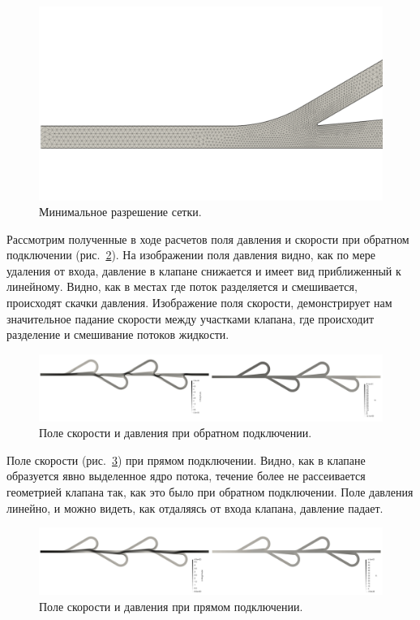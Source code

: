 \documentclass[10pt,a4paper]{book}
\begin{document}
    \begin{figure}[H]
        \centering
        \includegraphics[width = 1\linewidth]{minMesh}
        \caption{Минимальное разрешение сетки.}
        \label{fig:minMesh}
    \end{figure}
    
    Рассмотрим полученные в ходе расчетов поля давления и скорости при обратном подключении (рис.~\ref{fig:UPFieldsReverse}). На изображении поля давления видно, как по мере удаления от входа, давление в клапане снижается и имеет вид приближенный к линейному. Видно, как в местах где поток разделяется и смешивается, происходят скачки давления. Изображение поля скорости, демонстрирует нам значительное падание скорости между участками клапана, где происходит разделение и смешивание потоков жидкости.
    
    \begin{figure}[H]
        \centering
        \includegraphics[width = 1\linewidth]{UPFieldsReverse}
        \caption{Поле скорости и давления при обратном подключении.}
        \label{fig:UPFieldsReverse}
    \end{figure}
    
    Поле скорости (рис.~\ref{fig:UPFieldsDirect}) при прямом подключении. Видно, как в клапане образуется явно выделенное ядро потока, течение более не рассеивается геометрией клапана так, как это было при обратном подключении. Поле давления линейно, и можно видеть, как отдаляясь от входа клапана, давление падает.
    
    \begin{figure}[H]
        \centering
        \includegraphics[width = 1\linewidth]{UPFieldsDirect}
        \caption{Поле скорости и давления при прямом подключении.}
        \label{fig:UPFieldsDirect}
    \end{figure}   
    
\end{document}
